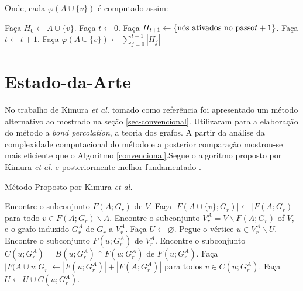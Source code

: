 \documentclass{acm_proc_article-sp}
\begin{document}
Onde, cada $\varphi(A \cup \{v\})$ é computado assim:

\begin{algorithm}[H]
\caption{}\label{}
\begin{algorithmic}[1]
\Procedure{}{}
	\State Faça $H_{0} \gets A \cup \{v\}$.
	\State Faça $t \gets 0$.
		\State Faça $H_{t+1} \gets \{\textnormal{nós ativados no passo} t+1\}$.
		\State Faça $t \gets t+1$.
	\EndWhile
	\State Faça $\varphi(A \cup \{v\}) \gets \sum^{t-1}_{j=0} |H_{j}|$
\EndProcedure
\end{algorithmic}
\end{algorithm}

\section{Estado-da-Arte}
No trabalho de Kimura \textit{et al.} tomado como referência foi apresentado um método alternativo ao mostrado na
seção \ref{sec-convencional}. Utilizaram para a elaboração do método a \textit{bond percolation}, a teoria dos grafos. A partir da análise da complexidade computacional do método e a
posterior comparação mostrou-se mais eficiente que o Algoritmo \ref{convencional}.Segue o algoritmo proposto por
Kimura \textit{et al.} \cite{kimura:2007} e posteriormente melhor fundamentado \cite{kimura:2010}.

\begin{algorithm}[H]
\caption{Método Proposto por Kimura \textit{et al.}}\label{kimura}
\begin{algorithmic}[1]
\Procedure{}{}
	\State Encontre o subconjunto $F(A;G_{r})$ de $V$.
	\State Faça $|F(A \cup \{v\};G_{r})| \gets |F(A;G_{r})|$ para todo $v \in F(A;G_{r}) \backslash A$.
	\State Encontre o subconjunto $V_{r}^{A} = V \backslash F(A;G_{r})$ of $V$, e o grafo induzido $G_{r}^{A}$ de $G_{r}$ a
	$V_{r}^{A}$.
	\State Faça $U \gets \varnothing$.
		\State Pegue o vértice $u \in V_{r}^{A} \backslash U$.
		\State Encontre o subconjunto $F(u;G_{r}^{A})$ de $V_{r}^{A}$.
		\State Encontre o subconjunto $C(u;G_{r}^{A}) = B(u;G_{r}^{A}) \cap F(u;G_{r}^{A})$ de $F(u;G_{r}^{A})$.
		\State Faça $|F(A\cup{v};G_{r}| \gets |F(u;G_{r}^{A})| + |F(A;G_{r}^{A})|$ para todos $v \in C(u;G_{r}^{A})$.
		\State Faça $U \gets U \cup C(u;G_{r}^{A})$.
	\EndWhile
\EndProcedure
\end{algorithmic}
\end{algorithm}
\end{document}
